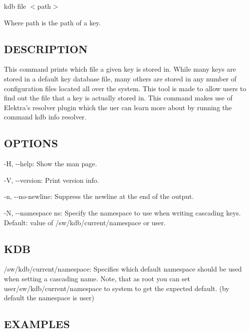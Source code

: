 {\ttfamily kdb file $<$path$>$}

Where {\ttfamily path} is the path of a key.

\subsection*{D\+E\+S\+C\+R\+I\+P\+T\+I\+O\+N}

This command prints which file a given key is stored in. While many keys are stored in a default key database file, many others are stored in any number of configuration files located all over the system. This tool is made to allow users to find out the file that a key is actually stored in. This command makes use of Elektra's {\ttfamily resolver} plugin which the uer can learn more about by running the command {\ttfamily kdb info resolver}.

\subsection*{O\+P\+T\+I\+O\+N\+S}


\begin{DoxyItemize}
\item {\ttfamily -\/\+H}, {\ttfamily -\/-\/help}\+: Show the man page.
\item {\ttfamily -\/\+V}, {\ttfamily -\/-\/version}\+: Print version info.
\item {\ttfamily -\/n}, {\ttfamily -\/-\/no-\/newline}\+: Suppress the newline at the end of the output.
\item {\ttfamily -\/\+N}, {\ttfamily -\/-\/namespace ns}\+: Specify the namespace to use when writing cascading keys. Default\+: value of {\ttfamily /sw/kdb/current/namespace} or user.
\end{DoxyItemize}

\subsection*{K\+D\+B}


\begin{DoxyItemize}
\item {\ttfamily /sw/kdb/current/namespace}\+: Specifies which default namespace should be used when setting a cascading name. Note, that as root you can set {\ttfamily user/sw/kdb/current/namespace} to {\ttfamily system} to get the expected default. (by default the namespace is user)
\end{DoxyItemize}

\subsection*{E\+X\+A\+M\+P\+L\+E\+S}

